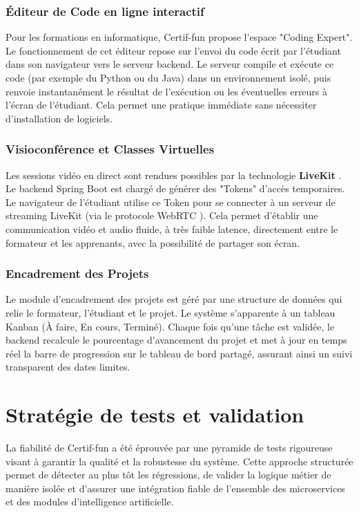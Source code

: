 \subsubsection{Éditeur de Code en ligne interactif}
Pour les formations en informatique, Certif-fun propose l'espace "Coding Expert". Le fonctionnement de cet éditeur repose sur l'envoi du code écrit par l'étudiant dans son navigateur vers le serveur backend. Le serveur compile et exécute ce code (par exemple du Python ou du Java) dans un environnement isolé, puis renvoie instantanément le résultat de l'exécution ou les éventuelles erreurs à l'écran de l'étudiant. Cela permet une pratique immédiate sans nécessiter d'installation de logiciels.

\subsubsection{Visioconférence et Classes Virtuelles}
Les sessions vidéo en direct sont rendues possibles par la technologie \textbf{LiveKit} \cite{livekit_docs}. Le backend Spring Boot est chargé de générer des "Tokens" d'accès temporaires. Le navigateur de l'étudiant utilise ce Token pour se connecter à un serveur de streaming LiveKit (via le protocole WebRTC \cite{romano2012webrtc}). Cela permet d'établir une communication vidéo et audio fluide, à très faible latence, directement entre le formateur et les apprenants, avec la possibilité de partager son écran.

\subsubsection{Encadrement des Projets}
Le module d'encadrement des projets est géré par une structure de données qui relie le formateur, l'étudiant et le projet. Le système s'apparente à un tableau Kanban (À faire, En cours, Terminé). Chaque fois qu'une tâche est validée, le backend recalcule le pourcentage d'avancement du projet et met à jour en temps réel la barre de progression sur le tableau de bord partagé, assurant ainsi un suivi transparent des dates limites.

\section{Stratégie de tests et validation}
La fiabilité de Certif-fun a été éprouvée par une pyramide de tests rigoureuse visant à garantir la qualité et la robustesse du système. Cette approche structurée permet de détecter au plus tôt les régressions, de valider la logique métier de manière isolée et d'assurer une intégration fiable de l'ensemble des microservices et des modules d'intelligence artificielle.

